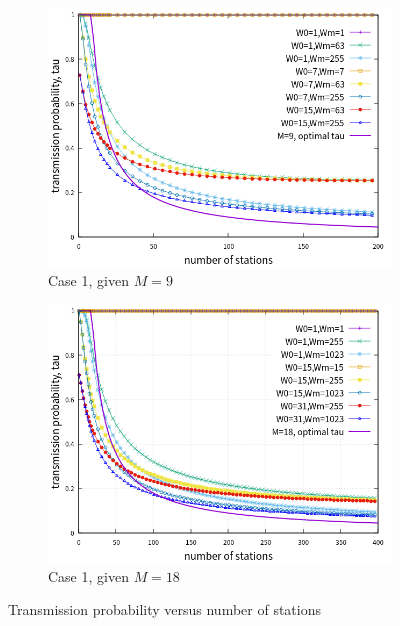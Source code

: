 \begin{figure}[!t]
\centering
\begin{subfigure}{\textwidth}
\centering
\includegraphics[scale=.85]{./figure/chp4/M9/n_tau_perf_M9_x200.png}
\caption{Case 1, given $M=9$}
\label{fig_tau_n_M9}
\end{subfigure}
\begin{subfigure}{\textwidth}
\centering
\includegraphics[scale=.85]{./figure/chp4/M18/n_tau_perf_M18_x400.png}
\caption{Case 1, given $M=18$}
\label{fig_tau_n_M18}
\end{subfigure}
\caption{Transmission probability versus number of stations}
\label{fig_tau_n}
\end{figure}

